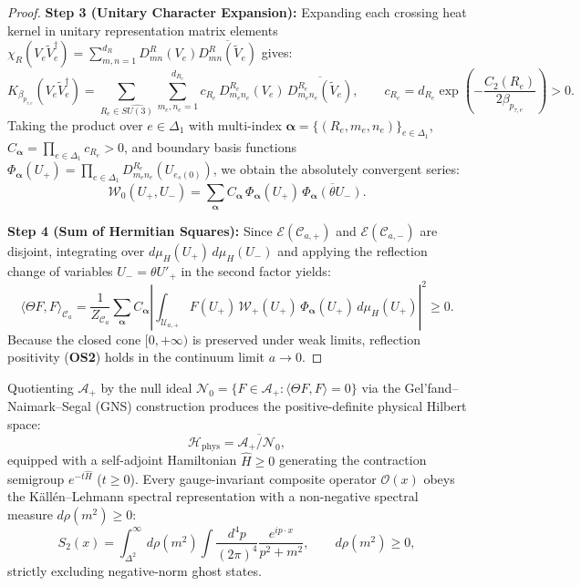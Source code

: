 \documentclass[11pt, a4paper]{article}
\theoremstyle{definition}
\theoremstyle{remark}
\begin{document}
\begin{proof}
\textbf{Step 3 (Unitary Character Expansion):} Expanding each crossing heat kernel in unitary representation matrix elements $\chi_{R}(V_{e}\widetilde{V}_{e}^{\dagger}) = \sum_{m,n=1}^{d_{R}} D_{mn}^{R}(V_{e})\overline{D_{mn}^{R}(\widetilde{V}_{e})}$ gives:
\begin{equation}
  K_{\beta_{p_{\tau, e}}}\!\left(V_{e}\widetilde{V}_{e}^{\dagger}\right) = \sum_{R_{e} \in \widehat{SU(3)}} \sum_{m_{e}, n_{e}=1}^{d_{R_{e}}} c_{R_{e}}\,D_{m_{e}n_{e}}^{R_{e}}(V_{e})\,\overline{D_{m_{e}n_{e}}^{R_{e}}(\widetilde{V}_{e})}, \qquad c_{R_{e}} = d_{R_{e}}\exp\!\left(-\frac{C_{2}(R_{e})}{2\beta_{p_{\tau, e}}}\right) > 0.
\end{equation}
Taking the product over $e \in \Delta_{1}$ with multi-index $\boldsymbol{\alpha} = \{(R_{e}, m_{e}, n_{e})\}_{e \in \Delta_{1}}$, $C_{\boldsymbol{\alpha}} = \prod_{e \in \Delta_{1}} c_{R_{e}} > 0$, and boundary basis functions $\Phi_{\boldsymbol{\alpha}}(U_{+}) = \prod_{e \in \Delta_{1}} D_{m_{e}n_{e}}^{R_{e}}(U_{e_{s}(0)})$, we obtain the absolutely convergent series:
\begin{equation}
  \mathcal{W}_{0}(U_{+}, U_{-}) = \sum_{\boldsymbol{\alpha}} C_{\boldsymbol{\alpha}}\,\Phi_{\boldsymbol{\alpha}}(U_{+})\,\overline{\Phi_{\boldsymbol{\alpha}}(\theta U_{-})}.
\end{equation}

\textbf{Step 4 (Sum of Hermitian Squares):} Since $\mathcal{E}(\mathcal{C}_{a,+})$ and $\mathcal{E}(\mathcal{C}_{a,-})$ are disjoint, integrating over $d\mu_{H}(U_{+})\,d\mu_{H}(U_{-})$ and applying the reflection change of variables $U_{-} = \theta U'_{+}$ in the second factor yields:
\begin{equation}
  \langle \Theta F, F \rangle_{\mathcal{C}_{a}} = \frac{1}{Z_{\mathcal{C}_{a}}} \sum_{\boldsymbol{\alpha}} C_{\boldsymbol{\alpha}} \left| \int_{\mathcal{U}_{a,+}} F(U_{+})\,\mathcal{W}_{+}(U_{+})\,\Phi_{\boldsymbol{\alpha}}(U_{+})\,d\mu_{H}(U_{+}) \right|^{2} \ge 0.
\end{equation}
Because the closed cone $[0, +\infty)$ is preserved under weak limits, reflection positivity (\textbf{OS2}) holds in the continuum limit $a \to 0$.
\end{proof}

Quotienting $\mathcal{A}_{+}$ by the null ideal $\mathcal{N}_{0} = \{F \in \mathcal{A}_{+} : \langle \Theta F, F \rangle = 0\}$ via the Gel'fand--Naimark--Segal (GNS) construction produces the positive-definite physical Hilbert space:
\begin{equation}
  \mathcal{H}_{\mathrm{phys}} = \overline{\mathcal{A}_{+} / \mathcal{N}_{0}},
\end{equation}
equipped with a self-adjoint Hamiltonian $\hat{H} \ge 0$ generating the contraction semigroup $e^{-t\hat{H}}$ ($t \ge 0$). Every gauge-invariant composite operator $\mathcal{O}(x)$ obeys the K\"all\'en--Lehmann spectral representation with a non-negative spectral measure $d\rho(m^{2}) \ge 0$:
\begin{equation}
  S_{2}(x) = \int_{\Delta^{2}}^{\infty} d\rho(m^{2}) \int \frac{d^{4}p}{(2\pi)^{4}} \frac{e^{ip\cdot x}}{p^{2} + m^{2}}, \qquad d\rho(m^{2}) \ge 0,
\end{equation}
strictly excluding negative-norm ghost states.
\end{document}
